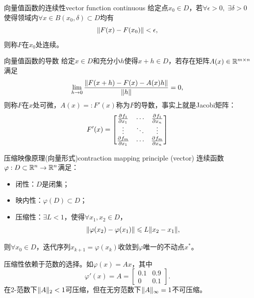 \begin{definition}
    {向量值函数的连续性}{vector function continuous}
    给定点$x_0 \in D$，若$\forall\epsilon > 0,\;\exists\delta > 0$使得领域内$\forall x \in B(x_0,\delta) \subset D$均有
    \[
        \lVert F(x) - F(x_0)\rVert < \epsilon,
    \]
    则称$F$在$x_0$处连续。
\end{definition}

\begin{definition}
    {向量值函数的导数}{}
    给定$x \in D$和充分小$h$使得$x + h \in D$，若存在矩阵$A(x) \in \mathbb{R}^{m\times n}$满足
    \begin{equation}
        \lim_{h\to 0}\frac{\lVert F(x + h) - F(x) - A(x)h\rVert}{\lVert h\rVert} = 0,
    \end{equation}
    则称$F$在$x$处可微，$A(x) =: F'(x)$称为$F$的导数，事实上就是Jacobi矩阵：
    \begin{equation}
        F'(x) = \begin{bmatrix}
            \frac{\partial^{}f_1}{\partial{x_1}^{}}&\cdots&\frac{\partial^{}f_1}{\partial{x_n}^{}}\\
            \vdots&\ddots&\vdots\\
            \frac{\partial^{}f_m}{\partial{x_1}^{}}&\cdots&\frac{\partial^{}f_m}{\partial{x_n}^{}}
        \end{bmatrix}
    \end{equation}
\end{definition}

\begin{theorem}
    {压缩映像原理(向量形式)}{contraction mapping principle (vector)}
    连续函数$\varphi:D \subset \mathbb{R}^n \to \mathbb{R}^n$满足：
    \begin{itemize}
        \item 闭性：$D$是闭集；
        \item 映内性：$\varphi(D) \subset D$；
        \item 压缩性：$\exists L < 1$，使得$\forall x_1,x_2 \in D$，
        \begin{equation}\label{eq:na-vector-contraction}
            \lVert\varphi(x_2) - \varphi(x_1)\rVert \leqslant L\lVert x_2 - x_1\rVert,
        \end{equation}
    \end{itemize}
    则$\forall x_0 \in D$，迭代序列$x_{k+1} = \varphi(x_k)$收敛到$\varphi$唯一的不动点$x^*$。
\end{theorem}

\begin{remark}
    压缩性依赖于范数的选择。如$\varphi(x) = Ax$，其中
    \[
        \varphi'(x) = A = \begin{bmatrix}
            0.1&0.9\\0&0.1
        \end{bmatrix}.
    \]
    在2-范数下$\lVert A\rVert_2 < 1$可压缩，但在无穷范数下$\lVert A\rVert_\infty = 1$不可压缩。
\end{remark}

